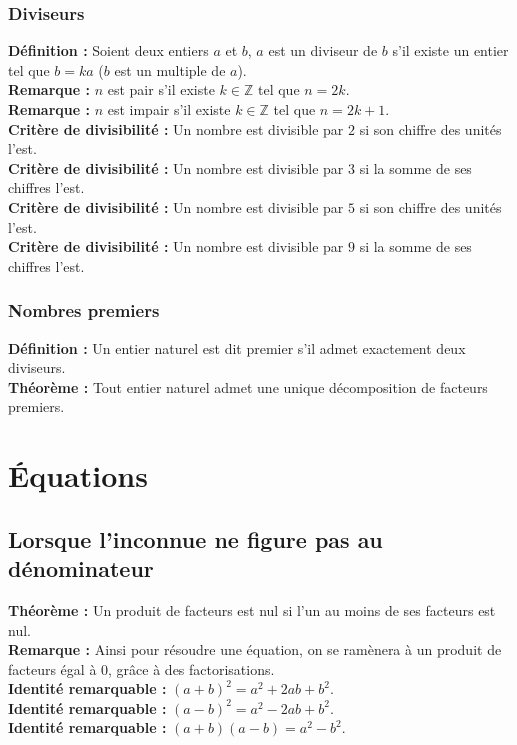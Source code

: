 \documentclass[a4paper,titlepage]{article}
\let\oldsection\section
\renewcommand\section{\clearpage\oldsection}
\begin{document}
        \subsubsection{Diviseurs}
            \textbf{Définition :} Soient deux entiers $a$ et $b$, $a$ est un diviseur de $b$ s’il existe un entier tel que $b=ka$ ($b$ est un multiple de $a$).
            \\
            \textbf{Remarque :} $n$ est pair s’il existe $k\in\mathbb{Z}$ tel que $n=2k$.
            \\
            \textbf{Remarque :} $n$ est impair s’il existe $k\in\mathbb{Z}$ tel que $n=2k+1$.
            \\
            \textbf{Critère de divisibilité :} Un nombre est divisible par $2$ si son chiffre des unités l’est.
            \\
            \textbf{Critère de divisibilité :} Un nombre est divisible par $3$ si la somme de ses chiffres l’est.
            \\
            \textbf{Critère de divisibilité :} Un nombre est divisible par $5$ si son chiffre des unités l’est.
            \\
            \textbf{Critère de divisibilité :} Un nombre est divisible par $9$ si la somme de ses chiffres l’est.
        \subsubsection{Nombres premiers}
            \textbf{Définition :} Un entier naturel est dit premier s’il admet exactement deux diviseurs.
            \\
            \textbf{Théorème :} Tout entier naturel admet une unique décomposition de facteurs premiers.
\section{Équations}
    \subsection{Lorsque l’inconnue ne figure pas au dénominateur}
        \textbf{Théorème :} Un produit de facteurs est nul si l’un au moins de ses facteurs est nul.
        \\
        \textbf{Remarque :} Ainsi pour résoudre une équation, on se ramènera à un produit de facteurs égal à 0, grâce à des factorisations.
        \\
        \textbf{Identité remarquable :} $\left(a+b\right)^{2}=a^{2}+{2}ab+b^{2}$.
        \\
        \textbf{Identité remarquable :} $\left(a-b\right)^{2}=a^{2}-{2}ab+b^{2}$.
        \\
        \textbf{Identité remarquable :} $\left(a+b\right)\left(a-b\right)=a^{2}-b^{2}$.
\end{document}
